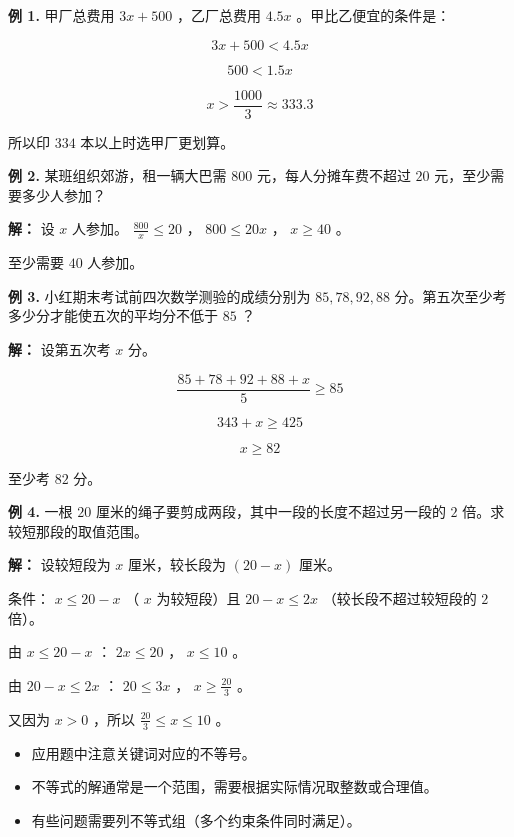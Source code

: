 \begin{workedexamples}


\textbf{例 1.} 甲厂总费用 $3x + 500$ ，乙厂总费用 $4.5x$ 。甲比乙便宜的条件是：

\[
3x + 500 < 4.5x
\]


\[
500 < 1.5x
\]


\[
x > \frac{1000}{3} \approx 333.3
\]


所以印 $334$ 本以上时选甲厂更划算。

\textbf{例 2.} 某班组织郊游，租一辆大巴需 $800$ 元，每人分摊车费不超过 $20$ 元，至少需要多少人参加？

\textbf{解：} 设 $x$ 人参加。 $\frac{800}{x} \leq 20$ ， $800 \leq 20x$ ， $x \geq 40$ 。

至少需要 $40$ 人参加。

\textbf{例 3.} 小红期末考试前四次数学测验的成绩分别为 $85, 78, 92, 88$ 分。第五次至少考多少分才能使五次的平均分不低于 $85$ ？

\textbf{解：} 设第五次考 $x$ 分。

\[
\frac{85 + 78 + 92 + 88 + x}{5} \geq 85
\]


\[
343 + x \geq 425
\]


\[
x \geq 82
\]


至少考 $82$ 分。

\textbf{例 4.} 一根 $20$ 厘米的绳子要剪成两段，其中一段的长度不超过另一段的 $2$ 倍。求较短那段的取值范围。

\textbf{解：} 设较短段为 $x$ 厘米，较长段为 $(20 - x)$ 厘米。

条件： $x \leq 20 - x$ （ $x$ 为较短段）且 $20 - x \leq 2x$ （较长段不超过较短段的 $2$ 倍）。

由 $x \leq 20 - x$ ： $2x \leq 20$ ， $x \leq 10$ 。

由 $20 - x \leq 2x$ ： $20 \leq 3x$ ， $x \geq \frac{20}{3}$ 。

又因为 $x > 0$ ，所以 $\frac{20}{3} \leq x \leq 10$ 。

\end{workedexamples}

\begin{keytakeaway}


\begin{itemize}
  \item 应用题中注意关键词对应的不等号。
  \item 不等式的解通常是一个范围，需要根据实际情况取整数或合理值。
  \item 有些问题需要列不等式组（多个约束条件同时满足）。
\end{itemize}


\end{keytakeaway}

